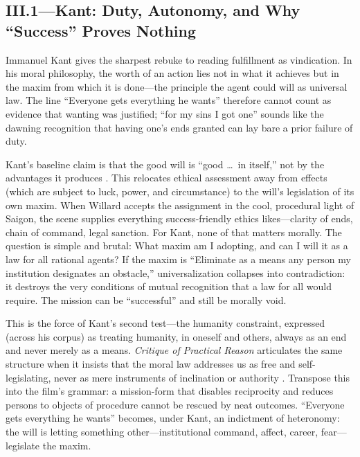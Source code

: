\subsection*{III.1—Kant: Duty, Autonomy, and Why ``Success'' Proves Nothing}
\label{ssec:iii-kant}
Immanuel Kant gives the sharpest rebuke to reading fulfillment as vindication. In his moral
philosophy, the worth of an action lies not in what it achieves but in the maxim from which
it is done—the
principle the agent could will as universal law. The line ``Everyone gets everything he wants''
therefore cannot count as evidence that wanting was justified; ``for my sins I got one'' sounds
like the dawning recognition that having one's ends granted can lay bare a prior failure of
duty.

Kant's baseline claim is that the good will is ``good \ldots\ in itself,'' not by the
advantages it produces \parencite[p.~27]{KantCPrR1996}. This relocates ethical assessment away
from effects (which are subject to luck, power, and circumstance) to the will's legislation of
its own maxim. When Willard accepts the assignment in the cool, procedural light of Saigon,
the scene supplies everything success-friendly ethics likes—clarity of ends, chain of command,
legal sanction. For Kant, none of that matters morally. The question is simple and brutal:
What maxim am I adopting, and can I will it as a law for all rational agents? If the maxim is
``Eliminate as a means any person my institution designates an obstacle,'' universalization
collapses into contradiction: it destroys the very conditions of mutual recognition that a law
for all would require. The mission can be ``successful'' and still be morally void.

This is the force of Kant's second test—the humanity constraint, expressed (across his corpus)
as treating humanity, in oneself and others, always as an end and never merely as a means.
\emph{Critique of Practical Reason} articulates the same structure when it insists that the
moral law addresses us as free and self-legislating, never as mere instruments of inclination
or authority \parencite[pp.~30--33]{KantCPrR1996}. Transpose this into the film's grammar:
a mission-form that disables reciprocity and reduces persons to objects of procedure cannot be
rescued by neat outcomes. ``Everyone gets everything he wants'' becomes, under Kant, an
indictment of heteronomy: the will is letting something other—institutional command, affect,
career, fear—legislate the maxim.

